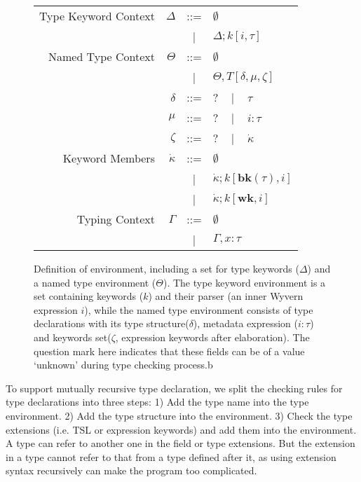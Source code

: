 \documentclass{sig-alternate}
\newcommand{\mycaption}[1]{\vspace{-4px}\caption{#1}\vspace{-2px}}
\begin{document}
\begin{figure}[ht]
\begin{center}
\begin{tabular}{r r c l}
Type Keyword Context & $\Delta$ & ::= & $\emptyset$\\
              &                 &  |  & $\Delta;k[i,\tau]$\\
Named Type Context  & $\Theta$        & ::= & $\emptyset$\\
              &                 &  |  & $\Theta,T[\delta,\mu,\zeta]$\\
              & $\delta$        & ::= & $?$ ~ | ~ $\tau$\\
   & $\mu$           & ::= & $?$ ~ | ~ $i:\tau$\\
   & $\zeta$         & ::= & $?$ ~ | ~ $\dot\kappa$\\
Keyword Members & $\dot\kappa$    & ::= & $\emptyset$\\
            &                 &   |  & $\dot\kappa;k[\mathbf{bk}(\tau),i]$\\
            &                 &   |  & $\dot\kappa;k[\mathbf{wk},i]$\\
Typing Context & $\Gamma$ &   ::=  & $\emptyset$\\
                 &          &     |  & $\Gamma,x:\tau$
\end{tabular}
\end{center}
\mycaption{Definition of environment, including a set for type keywords ($\Delta$) and a named type environment ($\Theta$). The type keyword environment is a set containing keywords ($k$) and their parser (an inner Wyvern expression $i$), while the named type environment consists of type declarations with its type structure($\delta$), metadata expression ($i:\tau$) and keywords set($\zeta$, expression keywords after elaboration). The question mark here indicates that these fields can be of a value `unknown' during type checking process.b}
\label{typechecking-environment}

\end{figure}


To support mutually recursive type declaration, we split the checking rules for type declarations into three steps: 1) Add the type name into the type environment. 2) Add the type structure into the environment. 3) Check the type extensions (i.e. TSL or expression keywords) and add them into the environment. A type can refer to another one in the field or type extensions. But the extension in a type cannot refer to that from a type defined after it, as using extension syntax recursively can make the program too complicated.
\end{document}
